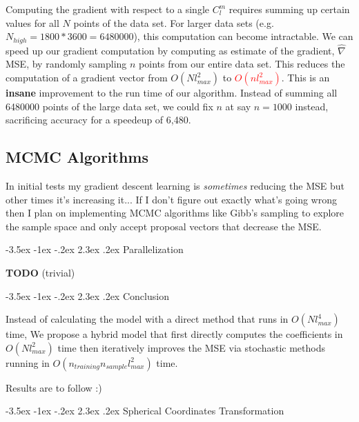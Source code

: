 \documentclass[a4paper]{article}
\makeatletter
\renewcommand\section{\@startsection{section}{1}{\z@}%
                                  {-3.5ex \@plus -1ex \@minus -.2ex}%
                                  {2.3ex \@plus.2ex}%
                                  {\normalfont\normalsize\bfseries}}
\theoremstyle{definition}
\makeatother
\begin{document}
Computing the gradient with respect to a single $C_l^m$ requires summing up certain values for all $N$ points of the data set. For larger data sets (e.g. $N_{high} = 1800 * 3600 = 6480000$), this
computation can become intractable. We can speed up our gradient computation by computing as estimate of the gradient, $\hat\nabla$MSE, by randomly sampling $n$ points from our entire
data set. This reduces the computation of a gradient vector from $O(Nl_{max}^2)$ to \textcolor{red}{$O(nl_{max}^2)$}. This is an \textbf{insane} improvement to the run time of our algorithm.
Instead of summing all 6480000 points of the large data set, we could fix $n$ at say $n = 1000$ instead, sacrificing accuracy for a speedeup of 6,480.

\subsection{MCMC Algorithms}

In initial tests my gradient descent learning is \textit{sometimes} reducing the MSE but other times it's increasing it... If I don't figure out exactly what's going wrong 
then I plan on implementing MCMC algorithms like Gibb's sampling to explore the sample space and only accept proposal vectors that decrease the MSE.

\section{Parallelization} 

\textbf{TODO} (trivial)

\section{Conclusion}

Instead of calculating the model with a direct method that runs in $O(Nl_{max}^4)$ time, We propose a hybrid model that first directly computes the coefficients in $O(Nl_{max}^2)$ time then 
iteratively improves the MSE via stochastic methods running in $O(n_{training}n_{sample}l_{max}^2)$ time.

Results are to follow :)





\appendix
\section{Spherical Coordinates Transformation}
\end{document}
